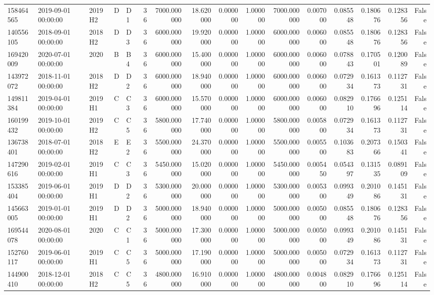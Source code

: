 \begin{tabular}{lllllrrrrrrrrrrr}
158464565 & 2019-09-01 00:00:00 & 2019H2 & D & D1 & 36 & 7000.000000 & 18.620000 & 0.000000 & 1.000000 & 7000.000000 & 0.007000 & 0.085548 & 0.180676 & 0.128356 & False \\
140556105 & 2018-09-01 00:00:00 & 2018H2 & D & D3 & 36 & 6000.000000 & 19.920000 & 0.000000 & 1.000000 & 6000.000000 & 0.006000 & 0.085548 & 0.180676 & 0.128356 & False \\
169420009 & 2020-07-01 00:00:00 & 2020 & B & B4 & 36 & 6000.000000 & 15.400000 & 0.000000 & 1.000000 & 6000.000000 & 0.006000 & 0.078843 & 0.170501 & 0.120089 & False \\
143972072 & 2018-11-01 00:00:00 & 2018H2 & D & D2 & 36 & 6000.000000 & 18.940000 & 0.000000 & 1.000000 & 6000.000000 & 0.006000 & 0.072934 & 0.161373 & 0.112731 & False \\
149811384 & 2019-04-01 00:00:00 & 2019H1 & C & C3 & 36 & 6000.000000 & 15.570000 & 0.000000 & 1.000000 & 6000.000000 & 0.006000 & 0.082910 & 0.176696 & 0.125114 & False \\
160199432 & 2019-10-01 00:00:00 & 2019H2 & C & C5 & 36 & 5800.000000 & 17.740000 & 0.000000 & 1.000000 & 5800.000000 & 0.005800 & 0.072934 & 0.161373 & 0.112731 & False \\
136738401 & 2018-07-01 00:00:00 & 2018H2 & E & E2 & 36 & 5500.000000 & 24.370000 & 0.000000 & 1.000000 & 5500.000000 & 0.005500 & 0.103683 & 0.207366 & 0.150341 & False \\
147290616 & 2019-02-01 00:00:00 & 2019H1 & C & C3 & 36 & 5450.000000 & 15.020000 & 0.000000 & 1.000000 & 5450.000000 & 0.005450 & 0.054397 & 0.131535 & 0.089109 & False \\
153385404 & 2019-06-01 00:00:00 & 2019H1 & D & D2 & 36 & 5300.000000 & 20.000000 & 0.000000 & 1.000000 & 5300.000000 & 0.005300 & 0.099349 & 0.201086 & 0.145131 & False \\
145663005 & 2019-01-01 00:00:00 & 2019H1 & D & D2 & 36 & 5000.000000 & 18.940000 & 0.000000 & 1.000000 & 5000.000000 & 0.005000 & 0.085548 & 0.180676 & 0.128356 & False \\
169544078 & 2020-08-01 00:00:00 & 2020 & C & C1 & 36 & 5000.000000 & 17.300000 & 0.000000 & 1.000000 & 5000.000000 & 0.005000 & 0.099349 & 0.201086 & 0.145131 & False \\
152760117 & 2019-06-01 00:00:00 & 2019H1 & C & C5 & 36 & 5000.000000 & 17.190000 & 0.000000 & 1.000000 & 5000.000000 & 0.005000 & 0.072934 & 0.161373 & 0.112731 & False \\
144900410 & 2018-12-01 00:00:00 & 2018H2 & C & C5 & 36 & 4800.000000 & 16.910000 & 0.000000 & 1.000000 & 4800.000000 & 0.004800 & 0.082910 & 0.176696 & 0.125114 & False \\

\end{tabular}
